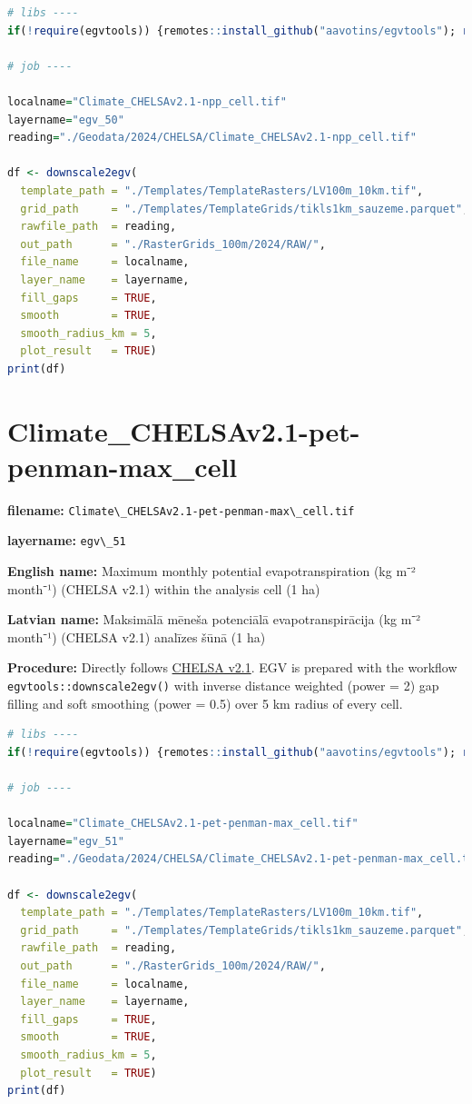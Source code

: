\documentclass[
]{book}
\newcommand{\passthrough}[1]{#1}
\begin{document}
\begin{lstlisting}[language=R]
# libs ----
if(!require(egvtools)) {remotes::install_github("aavotins/egvtools"); require(egvtools)}

# job ----

localname="Climate_CHELSAv2.1-npp_cell.tif"
layername="egv_50"
reading="./Geodata/2024/CHELSA/Climate_CHELSAv2.1-npp_cell.tif"

df <- downscale2egv(
  template_path = "./Templates/TemplateRasters/LV100m_10km.tif",
  grid_path     = "./Templates/TemplateGrids/tikls1km_sauzeme.parquet",
  rawfile_path  = reading,
  out_path      = "./RasterGrids_100m/2024/RAW/",
  file_name     = localname,
  layer_name    = layername,
  fill_gaps     = TRUE,
  smooth        = TRUE,
  smooth_radius_km = 5,
  plot_result   = TRUE)
print(df)
\end{lstlisting}

\section{Climate\_CHELSAv2.1-pet-penman-max\_cell}\label{ch06.051}

\textbf{filename:} \passthrough{\lstinline!Climate\_CHELSAv2.1-pet-penman-max\_cell.tif!}

\textbf{layername:} \passthrough{\lstinline!egv\_51!}

\textbf{English name:} Maximum monthly potential evapotranspiration (kg m⁻² month⁻¹) (CHELSA v2.1) within the analysis cell (1 ha)

\textbf{Latvian name:} Maksimālā mēneša potenciālā evapotranspirācija (kg m⁻² month⁻¹) (CHELSA v2.1) analīzes šūnā (1 ha)

\textbf{Procedure:} Directly follows \hyperref[Ch04.11]{CHELSA v2.1}. EGV is prepared with the
workflow \passthrough{\lstinline!egvtools::downscale2egv()!} with inverse distance weighted (power = 2)
gap filling and soft smoothing (power = 0.5) over 5 km radius of every cell.

\begin{lstlisting}[language=R]
# libs ----
if(!require(egvtools)) {remotes::install_github("aavotins/egvtools"); require(egvtools)}

# job ----

localname="Climate_CHELSAv2.1-pet-penman-max_cell.tif"
layername="egv_51"
reading="./Geodata/2024/CHELSA/Climate_CHELSAv2.1-pet-penman-max_cell.tif"

df <- downscale2egv(
  template_path = "./Templates/TemplateRasters/LV100m_10km.tif",
  grid_path     = "./Templates/TemplateGrids/tikls1km_sauzeme.parquet",
  rawfile_path  = reading,
  out_path      = "./RasterGrids_100m/2024/RAW/",
  file_name     = localname,
  layer_name    = layername,
  fill_gaps     = TRUE,
  smooth        = TRUE,
  smooth_radius_km = 5,
  plot_result   = TRUE)
print(df)
\end{lstlisting}
\end{document}
